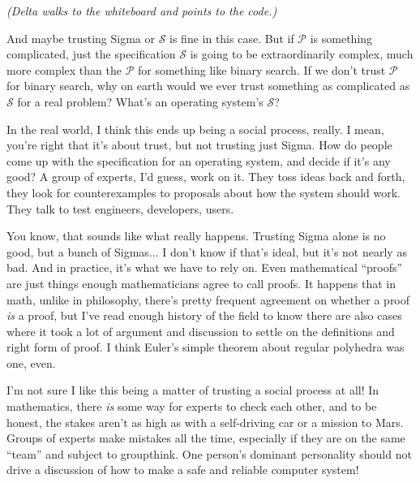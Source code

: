 \documentclass[sigplan]{acmart}
\begin{document}
\vspace{0.1in}

\emph{(Delta walks to the whiteboard and points to the code.)}

\vspace{0.1in}

  And maybe trusting Sigma or $\mathcal{S}$
is fine in this case.  But if $\mathcal{P}$ is something complicated,
just the specification $\mathcal{S}$ is going to be extraordinarily
complex, much more complex than the $\mathcal{P}$ for something like
binary search.  If we don't trust $\mathcal{P}$ for binary search, why
on earth would we ever trust something as complicated as $\mathcal{S}$
for a real problem?  What's an operating system's $\mathcal{S}$?

  In the real world, I think this ends up
being a social process, really.  I mean, you're right that it's about
trust, but not trusting just Sigma.  How do people come up with the
specification for an operating system, and decide if it's any good?  A
group of experts, I'd guess, work on it.  They toss ideas back and
forth, they look for counterexamples to proposals about how the system
should work.  They talk to test engineers, developers, users.

 You know, that sounds like what really
happens.  Trusting Sigma alone is no good, but a bunch of Sigmas...  I
don't know if that's ideal, but it's not nearly as bad.  And in
practice, it's what we have to rely on.  Even mathematical ``proofs''
are just things enough mathematicians agree to call proofs.  It
happens that in math, unlike in philosophy, there's pretty frequent
agreement on whether a proof \emph{is} a proof, but I've read enough
history of the field to know there are also cases where it took a lot
of argument and discussion to settle on the definitions and right form
of proof.  I think Euler's simple theorem about regular polyhedra was
one, even.

  I'm not sure I like this being a matter
of trusting a social process at all!  In mathematics, there \emph{is}
some way for experts to check each other, and to be honest, the stakes
aren't as high as with a self-driving car or a mission to Mars.
Groups of experts make mistakes all the time, especially if they are
on the same ``team'' and subject to groupthink.  One person's dominant
personality should not drive a discussion of how to make a safe and
reliable computer system!
\end{document}
